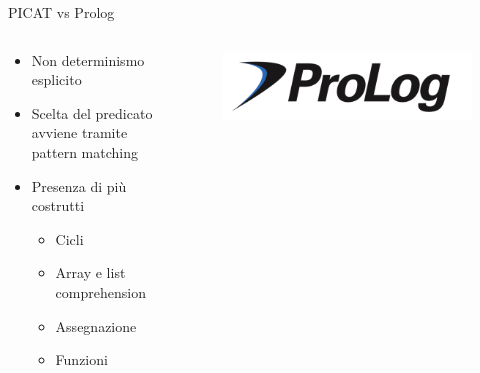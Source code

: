 \begin{frame}[fragile]{PICAT vs Prolog}

	\begin{columns}

		\begin{column}{1\textwidth}

			\begin{itemize}
				\item Non determinismo esplicito
				\item Scelta del predicato avviene tramite pattern matching
				\item Presenza di più costrutti
					\begin{itemize}
						\item Cicli
						\item Array e list comprehension
						\item Assegnazione
						\item Funzioni
					\end{itemize}
			\end{itemize}

		\end{column}

		\begin{column}{0.1\textwidth}
			\begin{figure}
				\vspace*{4cm}
				\hspace*{-4.5cm}
				\includegraphics[scale=0.2]{res/prologLogo}
			\end{figure}
		\end{column}

	\end{columns}

\end{frame}

